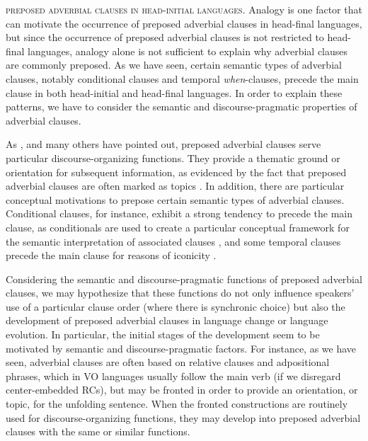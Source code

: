 \documentclass[output=paper]{langsci/langscibook}
\begin{document}
\textsc{preposed} \textsc{adverbial} \textsc{clauses} \textsc{in} \textsc{head-initial} \textsc{languages}. Analogy is one factor that can motivate the occurrence of preposed adverbial clauses in head-final languages, but since the occurrence of preposed adverbial clauses is not restricted to head-final languages, analogy alone is not sufficient to explain why adverbial clauses are commonly preposed. As we have seen, certain semantic types of adverbial clauses, notably conditional clauses and temporal \textit{when}-clauses, precede the main clause in both head-initial and head-final languages. In order to explain these patterns, we have to consider the semantic and discourse-pragmatic properties of adverbial clauses.

As \citet{Chafe1984}, \citet{Givón1984} and many others have pointed out, preposed adverbial clauses serve particular discourse-organizing functions. They provide a thematic ground or orientation for subsequent information, as evidenced by the fact that preposed adverbial clauses are often marked as topics \citep{Haiman1978}. In addition, there are particular conceptual motivations to prepose certain semantic types of adverbial clauses. Conditional clauses, for instance, exhibit a strong tendency to precede the main clause, as conditionals are used to create a particular conceptual framework for the semantic interpretation of associated clauses \citep{Diessel2005}, and some temporal clauses precede the main clause for reasons of iconicity \citep{Diessel2008}. 

Considering the semantic and discourse-pragmatic functions of preposed adverbial clauses, we may hypothesize that these functions do not only influence speakers’ use of a particular clause order (where there is synchronic choice) but also the development of preposed adverbial clauses in language change or language evolution. In particular, the initial stages of the development seem to be motivated by semantic and discourse-pragmatic factors. For instance, as we have seen, adverbial clauses are often based on relative clauses and adpositional phrases, which in VO languages usually follow the main verb (if we disregard center-embedded RCs), but may be fronted in order to provide an orientation, or topic, for the unfolding sentence. When the fronted constructions are routinely used for discourse-organizing functions, they may develop into preposed adverbial clauses with the same or similar functions. 
\end{document}
